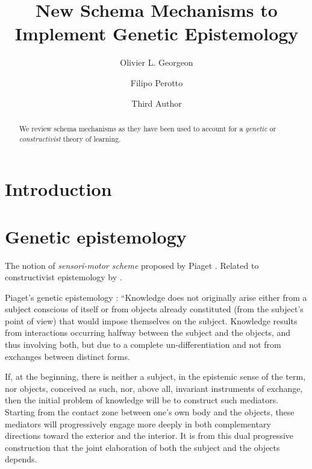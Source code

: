 \documentclass[runningheads]{llncs}
\begin{document}
%
\title{New Schema Mechanisms to Implement Genetic Epistemology}
%
%
\author{Olivier L. Georgeon \and
Filipo Perotto \and
Third Author}
%
%
%
\maketitle              %
%
\begin{abstract}
We review schema mechanisms as they have been used to account for a \textit{genetic} or \textit{constructivist} theory of learning.

\end{abstract}
%
%
%
\section{Introduction}



\section{Genetic epistemology}

The notion of \textit{sensori-motor scheme} proposed by Piaget \cite{piaget_principles_1997}. 
Related to constructivist epistemology by \cite{glasersfeld_radical_1997}.


Piaget's genetic epistemology : 
``Knowledge does not originally arise either from a subject conscious of itself or from objects already constituted (from the subject's point of view) that would impose themselves on the subject. 
Knowledge results from interactions occurring halfway between the subject and the objects, and thus involving both, but due to a complete un-differentiation and not from exchanges between distinct forms.

If, at the beginning, there is neither a subject, in the epistemic sense of the term, nor objects, conceived as such, nor, above all, invariant instruments of exchange, then the initial problem of knowledge will be to construct such mediators. 
Starting from the contact zone between one's own body and the objects, these mediators will progressively engage more deeply in both complementary directions toward the exterior and the interior. 
It is from this dual progressive construction that the joint elaboration of both the subject and the objects depends.
\end{document}
